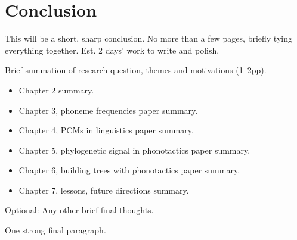 \chapter[Conclusion]{Conclusion}
\label{ch-conclusion}

This will be a short, sharp conclusion. No more than a few pages, briefly tying everything together. Est. 2 days' work to write and polish.

Brief summation of research question, themes and motivations (1--2pp).

\begin{itemize}
\item
  Chapter 2 summary.
\item
  Chapter 3, phoneme frequencies paper summary.
\item
  Chapter 4, PCMs in linguistics paper summary.
\item
  Chapter 5, phylogenetic signal in phonotactics paper summary.
\item
  Chapter 6, building trees with phonotactics paper summary.
\item
  Chapter 7, lessons, future directions summary.
\end{itemize}

Optional: Any other brief final thoughts.

One strong final paragraph.

